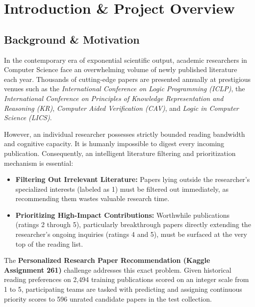 \chapter{Introduction \& Project Overview}
\label{chap:intro}

\section{Background \& Motivation}
In the contemporary era of exponential scientific output, academic researchers in Computer Science face an overwhelming volume of newly published literature each year. Thousands of cutting-edge papers are presented annually at prestigious venues such as the \textit{International Conference on Logic Programming (ICLP)}, the \textit{International Conference on Principles of Knowledge Representation and Reasoning (KR)}, \textit{Computer Aided Verification (CAV)}, and \textit{Logic in Computer Science (LICS)}.

However, an individual researcher possesses strictly bounded reading bandwidth and cognitive capacity. It is humanly impossible to digest every incoming publication. Consequently, an intelligent literature filtering and prioritization mechanism is essential:
\begin{itemize}
  \item \textbf{Filtering Out Irrelevant Literature:} Papers lying outside the researcher's specialized interests (labeled as 1) must be filtered out immediately, as recommending them wastes valuable research time.
  \item \textbf{Prioritizing High-Impact Contributions:} Worthwhile publications (ratings 2 through 5), particularly breakthrough papers directly extending the researcher's ongoing inquiries (ratings 4 and 5), must be surfaced at the very top of the reading list.
\end{itemize}

The \textbf{Personalized Research Paper Recommendation (Kaggle Assignment 261)} challenge addresses this exact problem. Given historical reading preferences on 2,494 training publications scored on an integer scale from 1 to 5, participating teams are tasked with predicting and assigning continuous priority scores to 596 unrated candidate papers in the test collection.

